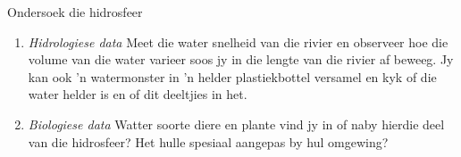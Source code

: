 \begin{Investigation}{Ondersoek die hidrosfeer }
\begin{enumerate}[noitemsep, label=\textbf{\arabic*}. ]
Meet en rekordeer data soos temperatuur, pH, geleidingsvermoë en die opgeloste suurstof by elke ligging. Alhoewel jy moontlik nie op die oomblik verstaan wat hierdie metings beteken nie, sal dit later vir jou duidelik word.
\label{m38138*uid7}\item \textsl{Hidrologiese data}
Meet die water snelheid van die rivier en observeer hoe die volume van die water varieer soos jy in die lengte van die rivier af beweeg. Jy kan ook  'n watermonster in  'n helder plastiekbottel versamel en kyk of die water helder is en of dit deeltjies in het.
\label{m38138*uid8}\item \textsl{Biologiese data}
Watter soorte diere en plante vind jy in of naby hierdie deel van die hidrosfeer? Het hulle spesiaal aangepas by hul omgewing?
\end{enumerate}


\end{Investigation}
